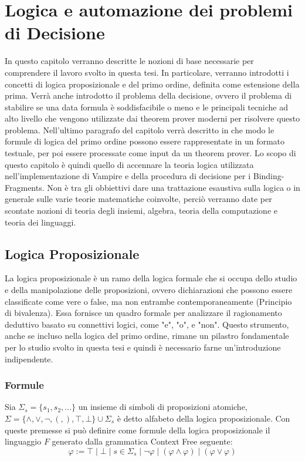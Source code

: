\documentclass[./main.tex]{subfiles}
\begin{document}
\chapter{Logica e automazione dei problemi di Decisione}

In questo capitolo verranno descritte le nozioni di base necessarie 
per comprendere il lavoro svolto in questa tesi. 
In particolare, verranno introdotti i concetti di logica proposizionale e 
del primo ordine, definita come estensione della prima.
Verrà anche introdotto il problema della decisione, ovvero il problema di stabilire se una data formula è soddisfacibile o meno
e le principali tecniche ad alto livello che vengono utilizzate dai theorem prover moderni per risolvere questo problema.
Nell'ultimo paragrafo del capitolo 
verrà descritto in che modo le formule di logica del 
primo ordine possono essere rappresentate in un formato testuale, per poi essere 
processate come input da un theorem prover. 
Lo scopo di questo capitolo è quindi quello di accennare la teoria logica utilizzata nell'implementazione di Vampire 
e della procedura di decisione per i Binding-Fragments.
Non è tra gli obbiettivi dare una trattazione esaustiva sulla logica o in generale sulle varie teorie matematiche coinvolte, 
perciò verranno date per scontate nozioni di teoria degli insiemi,
algebra, teoria della computazione e teoria dei linguaggi.



\section{Logica Proposizionale}

La logica proposizionale è un ramo della logica formale che si occupa dello studio e della manipolazione delle proposizioni, 
ovvero dichiarazioni che possono essere classificate come vere o false, ma non entrambe contemporaneamente (Principio di bivalenza).
Essa fornisce un quadro formale per analizzare il ragionamento deduttivo basato su connettivi logici, come "e", "o", e "non".
Questo strumento, anche se incluso nella logica del primo ordine,
rimane un pilastro fondamentale per lo studio svolto in questa tesi e quindi è necessario farne un'introduzione indipendente.

\subsection{Formule} \label{sec:sintassi_bool}
Sia $\Sigma_s = \{s_1, s_2, ...\}$ un insieme di simboli di proposizioni atomiche, 
$\Sigma = \{ \land, \lor, \lnot, (, ), \top, \bot\} \cup \Sigma_s$ è detto alfabeto della logica proposizionale. 
Con queste premesse si può definire come formule della logica proposizionale il linguaggio $F$ generato dalla
grammatica Context Free seguente:
$$
\varphi  := \top \mid \bot \mid s \in \Sigma_s \mid \lnot \varphi \mid (\varphi \land \varphi) \mid (\varphi \lor \varphi)
$$
\end{document}
